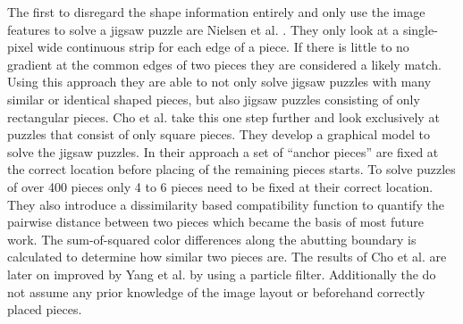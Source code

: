 \documentclass[11pt]{report}
\begin{document}
The first to disregard the shape information entirely and only use the image
features to solve a jigsaw puzzle are Nielsen et al. \cite{nielsen2008solving}.
They only look at a single-pixel wide continuous strip for each edge of a piece.
If there is little to no gradient at the common edges of two pieces they are
considered a likely match. Using this approach they are able to not only solve
jigsaw puzzles with many similar or identical shaped pieces, but also jigsaw
puzzles consisting of only rectangular pieces. Cho et al. \cite{Cho2010} take
this one step further and look exclusively at puzzles that consist of only
square pieces. They develop a graphical model to solve the jigsaw puzzles. In
their approach a set of ``anchor pieces'' are fixed at the correct location
before placing of the remaining pieces starts. To solve puzzles of over 400
pieces only 4 to 6 pieces need to be fixed at their correct location. They also
introduce a dissimilarity based compatibility function to quantify the pairwise
distance between two pieces which became the basis of most future work. The
sum-of-squared color differences along the abutting boundary is calculated to
determine how similar two pieces are. The results of Cho et al. are later on
improved by Yang et al.\cite{yang2011particle} by using a particle filter.
Additionally the do not assume any prior knowledge of the image layout or
beforehand correctly placed pieces.
\end{document}
